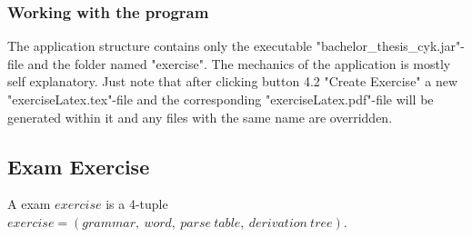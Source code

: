 \subsubsection{Working with the program}
The application structure contains only the executable "bachelor\_thesis\_\allowbreak cyk.jar"-file and the folder named "exercise". The mechanics of the application is mostly self explanatory. Just note that after clicking button 4.2 "Create Exercise" a new "exerciseLatex.tex"-file and the corresponding "exerciseLatex.pdf"-file will be generated within it and any files with the same name are overridden.

\subsection{Exam Exercise}
A exam $exercise$ is a 4-tuple $exercise = (grammar,\ word,\ parse\ table,\ derivation\ tree)$. 

